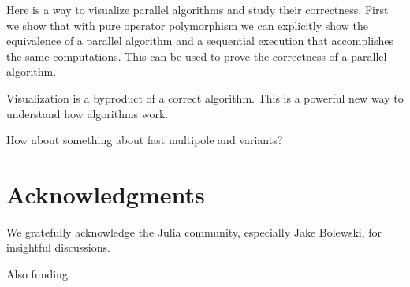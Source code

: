 \documentclass{sig-alternate}
\begin{document}
Here is a way to visualize parallel algorithms and study their correctness. First we show that with pure operator polymorphism we can explicitly show the equivalence of a parallel algorithm and a sequential execution that accomplishes the same computations. This can be used to prove the correctness of a parallel algorithm.

Visualization is a byproduct of a correct algorithm. This is a powerful new way to understand how algorithms work.

How about something about fast multipole and variants?

\section{Acknowledgments}
We gratefully acknowledge the Julia community, especially Jake Bolewski, for insightful discussions.

Also funding.



\end{document}
